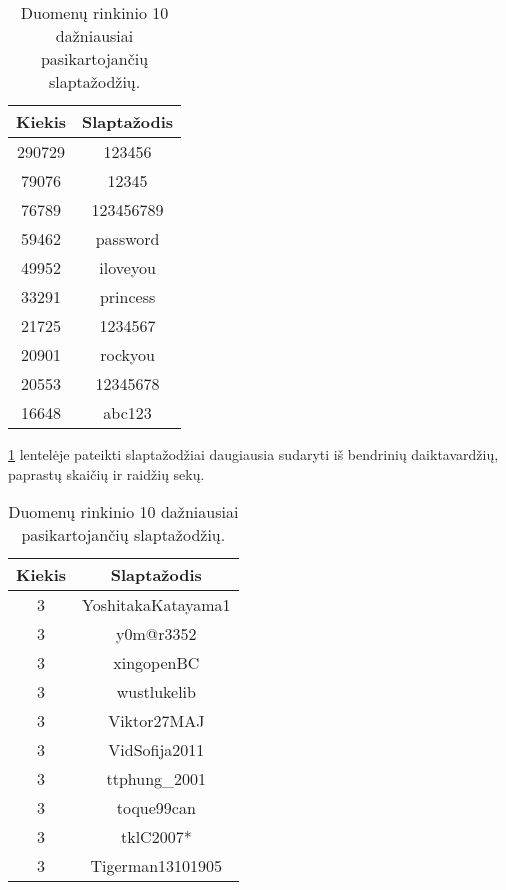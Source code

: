 \documentclass{VUMIFInfBakalaurinis}
\begin{document}
\begin{table}[hb]
  \centering
  \caption{%
    Duomenų rinkinio  10 dažniausiai pasikartojančių 
    slaptažodžių.
  }
  \begin{tabular}{|c|c|}
    \hline \textbf{Kiekis} & \textbf{Slaptažodis} \\
    \hline 290729 & 123456 \\
    \hline 79076 & 12345 \\
    \hline 76789 & 123456789 \\
    \hline 59462 & password \\
    \hline 49952 & iloveyou \\
    \hline 33291 & princess \\
    \hline 21725 & 1234567 \\
    \hline 20901 & rockyou \\
    \hline 20553 & 12345678 \\
    \hline 16648 & abc123 \\
    \hline
  \end{tabular}
  \label{tab:rockyou10}
\end{table}

\ref{tab:rockyou10} lentelėje pateikti slaptažodžiai daugiausia sudaryti iš 
bendrinių daiktavardžių, paprastų skaičių ir raidžių sekų.

\begin{table}[ht]
  \centering
  \caption{%
    Duomenų rinkinio  10 dažniausiai pasikartojančių 
    slaptažodžių.
  }
  \begin{tabular}{|c|c|}
    \hline \textbf{Kiekis} & \textbf{Slaptažodis} \\
    \hline 3 & YoshitakaKatayama1 \\
    \hline 3 & y0m@r3352 \\
    \hline 3 & xingopenBC \\
    \hline 3 & wustlukelib \\
    \hline 3 & Viktor27MAJ \\
    \hline 3 & VidSofija2011 \\
    \hline 3 & ttphung_2001 \\
    \hline 3 & toque99can \\
    \hline 3 & tklC2007* \\
    \hline 3 & Tigerman13101905 \\
    \hline
  \end{tabular}
  \label{tab:linkedin10}
\end{table}
\end{document}
